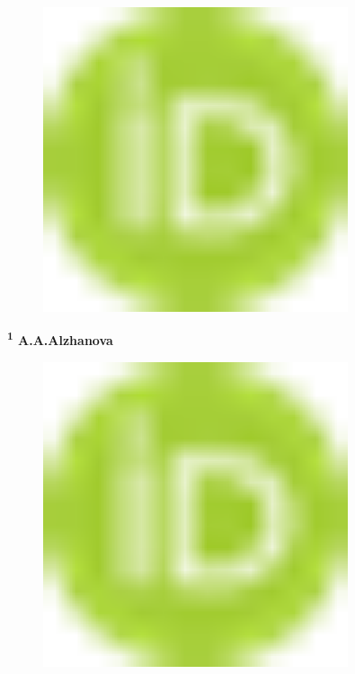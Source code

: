 \begin{figure}[H]
	\centering
	\includegraphics[width=0.8\textwidth]{media/ekon2/image1}
	\caption*{}
\end{figure}


{\bfseries \textsuperscript{1} A.A.Alzhanova}
\begin{figure}[H]
	\centering
	\includegraphics[width=0.8\textwidth]{media/ekon2/image1}
	\caption*{}
\end{figure}

